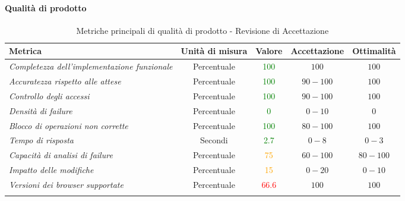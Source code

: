 \paragraph{Qualità di prodotto}
\begin{longtable}{|>{\centering}m{5cm}|c|c|c|c|}
\hline
\textbf{Metrica} & \textbf{Unità di misura} & \textbf{Valore} & \textbf{Accettazione} & \textbf{Ottimalità}\\
\hline
\endhead
\emph{Completezza dell'implementazione funzionale} & {Percentuale} & \textcolor{Green}{100} & $100$ & $100$\\ \hline
\emph{Accuratezza rispetto alle attese} & {Percentuale} & \textcolor{Green}{100} & $90 - 100$ & $100$\\ \hline
\emph{Controllo degli accessi} & {Percentuale} & \textcolor{Green}{100} & $90 - 100$ & $100$\\ \hline
\emph{Densità di failure} & {Percentuale} & \textcolor{Green}{0} & $0 - 10$  & $0$\\ \hline
\emph{Blocco di operazioni non corrette} & {Percentuale} & \textcolor{Green}{100} & $80 - 100$  & $100$\\ \hline
\emph{Tempo di risposta} & {Secondi} & \textcolor{Green}{2.7} & $0 - 8$ & $0 - 3$\\ \hline
\emph{Capacità di analisi di failure} & {Percentuale} & \textcolor{Orange}{75} & $60 - 100$ & $80 - 100$\\ \hline
\emph{Impatto delle modifiche} & {Percentuale} & \textcolor{Orange}{15} & $0 - 20$ & $0 - 10$\\ \hline
\emph{Versioni dei browser supportate} & {Percentuale} & \textcolor{Red}{66.6} & $100$ & $100$\\ \hline
\caption{Metriche principali di qualità di prodotto - Revisione di Accettazione}
\end{longtable}